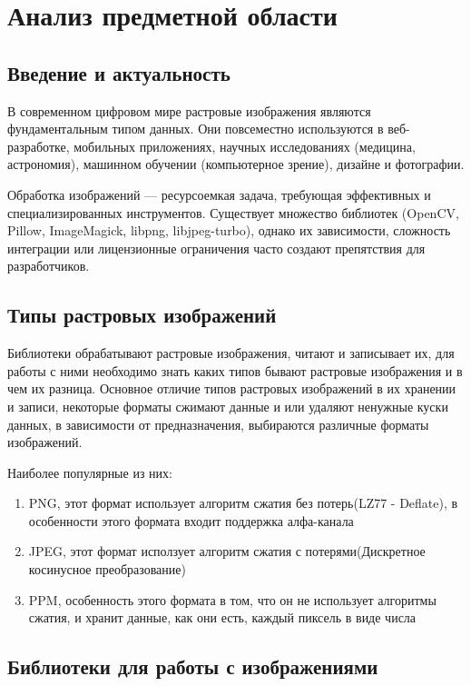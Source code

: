 \section{Анализ предметной области}
\subsection{Введение и актуальность}

В современном цифровом мире растровые изображения являются фундаментальным типом данных. Они повсеместно используются в веб-разработке, мобильных приложениях, научных исследованиях (медицина, астрономия), машинном обучении (компьютерное зрение), дизайне и фотографии.

Обработка изображений — ресурсоемкая задача, требующая эффективных и специализированных инструментов. Существует множество библиотек (OpenCV, Pillow, ImageMagick, libpng, libjpeg-turbo), однако их зависимости, сложность интеграции или лицензионные ограничения часто создают препятствия для разработчиков.

\subsection{Типы растровых изображений}

Библиотеки обрабатывают растровые изображения, читают и записывает их, для работы с ними необходимо знать каких типов бывают растровые изображения и в чем их разница. Основное отличие типов растровых изображений в их хранении и записи, некоторые форматы сжимают данные и или удаляют ненужные куски данных, в зависимости от предназначения, выбираются различные форматы изображений.

Наиболее популярные из них:
\begin{enumerate}
\item PNG, этот формат использует алгоритм сжатия без потерь(LZ77 - Deflate), в особенности этого формата входит поддержка алфа-канала
\item JPEG, этот формат исползует алгоритм сжатия с потерями(Дискретное косинусное преобразование)
\item PPM, особенность этого формата в том, что он не использует алгоритмы сжатия, и хранит данные, как они есть, каждый пиксель в виде числа
\end{enumerate}

\subsection{Библиотеки для работы с изображениями}

